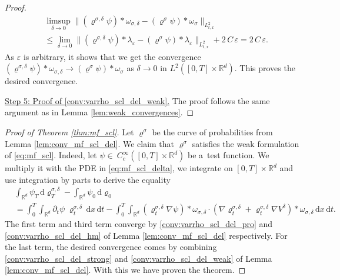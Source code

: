 \documentclass[reqno, 11pt]{amsart}
\numberwithin{equation}{section}
\theoremstyle{definition}
\begin{document}
\begin{proof}
    \begin{align*}
        &\limsup_{\delta\to 0}\|(\varrho^{\sigma,\delta}\psi)\ast\omega_{\sigma,\delta}-(\varrho^\sigma\psi)\ast\omega_\sigma\|_{L_{t,x}^2}
        \\
        &\leq \lim_{\delta\to 0}\|(\varrho^{\sigma,\delta}\psi)\ast\lambda_\varepsilon-(\varrho^\sigma\psi)\ast\lambda_\varepsilon\|_{L_{t,x}^2}+2\,C\,\varepsilon
        =2\,C\,\varepsilon.
    \end{align*}
    As $\varepsilon$ is arbitrary, it shows that we get the convergence $(\varrho^{\sigma,\delta}\psi)\ast\omega_{\sigma,\delta}\to (\varrho^\sigma\psi)\ast\omega_\sigma$ as $\delta\to 0$ in $L^2([0,T]\times \mathbb{R}^{d})$. This proves the desired convergence.
    
    \underline{Step 5: Proof of \ref{conv:varrho_scl_del_weak}.} The proof follows the same argument as in Lemma \ref{lem:weak_convergences}.
\end{proof}

\begin{proof}[Proof of Theorem \ref{thm:mf_scl}]
    Let $\varrho^\sigma$ be the curve of probabilities from Lemma \ref{lem:conv_mf_scl_del}. We claim that $\varrho^\sigma$ satisfies the weak formulation of \eqref{eq:mf_scl}. Indeed, let $\psi\in~ C_c^\infty([0,T]\times \mathbb{R}^{d})$ be a~test function. We multiply it with the PDE in \eqref{eq:mf_scl_delta}, we integrate on $[0,T]\times \mathbb{R}^{d}$ and use integration by parts to derive the equality
    \begin{align*}
        &\int_{\mathbb{R}^{d}}\psi_T\,\mathrm{d} \varrho_T^{\sigma,\delta}-\int_{\mathbb{R}^{d}}\psi_0\,\mathrm{d} \varrho_0\\
        &=\int_0^T \int_{\mathbb{R}^{d}} \partial_t\psi\; \varrho_t^{\sigma,\delta}\,\mathrm{d} x\,\mathrm{d} t
        -\int_0^T \int_{\mathbb{R}^{d}}(\varrho_t^{\sigma,\delta}\nabla\psi)\ast\omega_{\sigma,\delta}\cdot  (\nabla \varrho_t^{\sigma,\delta}+\varrho_t^{\sigma,\delta}\nabla V^\delta)\ast\omega_{\sigma,\delta}\,\mathrm{d} x\,\mathrm{d} t.
    \end{align*}
    The first term and third term converge by \ref{conv:varrho_scl_del_pro} and \ref{conv:varrho_scl_del_hm} of Lemma \ref{lem:conv_mf_scl_del} respectively. For the last term, the desired convergence comes by combining \ref{conv:varrho_scl_del_strong} and \ref{conv:varrho_scl_del_weak} of Lemma \ref{lem:conv_mf_scl_del}. With this we have proven the theorem.
\end{proof}
\end{document}
